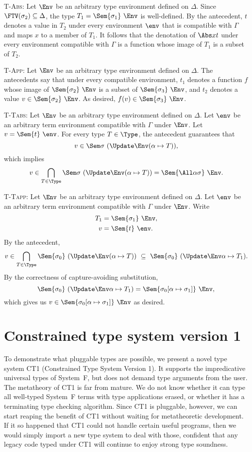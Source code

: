 \documentclass{amsart}
\begin{document}
\textsc{T-Abs}: Let $\Env$ be an arbitrary type environment
defined on $\Delta$. Since $\FTV(\sigma_2)\subseteq\Delta$, the
type $T_1=\Sem{\sigma_1}~\Env$ is well-defined. By the
antecedent, $t$ denotes a value in $T_2$ under every environment
$\env$ that is compatible with $\Gamma$ and maps $x$ to a member
of $T_1$. It follows that the denotation of $\Abs xt$ under every
environment compatible with $\Gamma$ is a function whose image of
$T_1$ is a subset of $T_2$.

\textsc{T-App}: Let $\Env$ be an arbitrary type environment
defined on $\Delta$. The antecedents say that under every
compatible environment, $t_1$ denotes a function $f$ whose image
of $\Sem{\sigma_2}~\Env$ is a subset of $\Sem{\sigma_3}~\Env$,
and $t_2$ denotes a value $v\in\Sem{\sigma_2}~\Env$. As desired,
$f(v)\in\Sem{\sigma_3}~\Env$.

\textsc{T-Tabs}: Let $\Env$ be an arbitrary type environment
defined on $\Delta$. Let $\env$ be an arbitrary term environment
compatible with $\Gamma$ under $\Env$. Let $v=\Sem{t}~\env$.
For every type $T\in\Type$, the antecedent guarantees that
\[
v\in\Sem\sigma~(\Update\Env(\alpha\mapsto T)),
\]
which implies
\[
v\in\bigcap_{T\in\Type}\Sem\sigma~(\Update\Env(\alpha\mapsto T))
=\Sem{\All\alpha\sigma}~\Env.
\]

\textsc{T-Tapp}: Let $\Env$ be an arbitrary type environment
defined on $\Delta$. Let $\env$ be an arbitrary term environment
compatible with $\Gamma$ under $\Env$. Write
\begin{align*}
T_1&=\Sem{\sigma_1}~\Env,\\
v&=\Sem{t}~\env.
\end{align*}
By the antecedent,
\[
v\in
\bigcap_{T\in\Type}\Sem{\sigma_0}~(\Update\Env(\alpha\mapsto T))
\ \subseteq\ \Sem{\sigma_0}~(\Update\Env\alpha\mapsto T_1).
\]
By the correctness of capture-avoiding substitution,
\[
\Sem{\sigma_0}~(\Update\Env\alpha\mapsto T_1)
=
\Sem{\sigma_0[\alpha\mapsto\sigma_1]}~\Env,
\]
which gives us $v\in\Sem{\sigma_0[\alpha\mapsto\sigma_1]}~\Env$
as desired.


\section{Constrained type system version 1}

To demonstrate what pluggable types are possible, we present a
novel type system CT1 (Constrained Type System Version 1). It
supports the impredicative universal types of System~F, but does
not demand type arguments from the user. The metatheory of CT1 is
far from mature. We do not know whether it can type all
well-typed System~F terms with type applications erased, or
whether it has a terminating type checking algorithm. Since CT1
is pluggable, however, we can start reaping the benefit of CT1
without waiting for metatheoretic development. If it so happened
that CT1 could not handle certain useful programs, then we would
simply import a new type system to deal with those, confident
that any legacy code typed under CT1 will continue to enjoy
strong type soundness.
\end{document}
